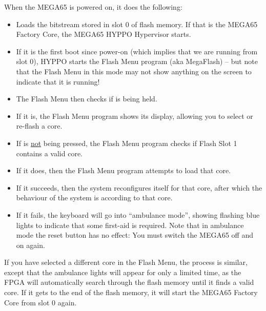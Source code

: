 When the MEGA65 is powered on, it does the following:
\begin{itemize}
\item Loads the bitstream stored in slot 0 of flash memory. If that is the MEGA65 Factory Core, the MEGA65 
  HYPPO Hypervisor starts.
\item If it is the first boot since power-on (which implies that we are running from slot 0), HYPPO starts the Flash Menu program (aka MegaFlash) -- but note that the Flash Menu in
      this mode may not show anything on the screen to indicate that it is running!
\item The Flash Menu then checks if  is being held.
\item If it is, the Flash Menu program shows its display, allowing you to select or re-flash a core.
\item If  is \underline{not} being pressed, the Flash Menu program checks if Flash Slot 1 contains a valid
      core.
\item If it does, then the Flash Menu program attempts to load that core.
\item If it succeeds, then the system reconfigures itself for that core, after which the behaviour of the system is
      according to that core.
\item If it fails, the keyboard will go into ``ambulance mode'', showing flashing blue lights to indicate that some
      first-aid is required. Note that in ambulance mode the reset button has no effect: You must switch the
      MEGA65 off and on again.
\end{itemize}



If you have selected a different core in the Flash Menu, the process
is similar, except that the ambulance lights will appear for only a
limited time, as the FPGA will automatically search through the flash
memory until it finds a valid core. If it gets to the end of the flash
memory, it will start the MEGA65 Factory Core from slot 0 again.




